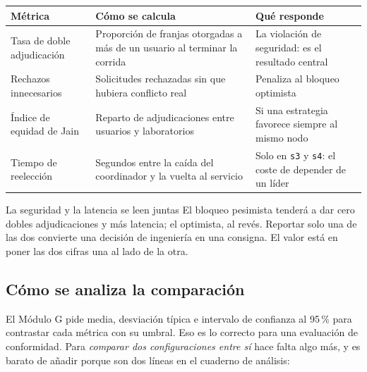 \documentclass[11pt,a4paper]{article}
\begin{document}
\begin{center}
	\small
	\begin{tabular}{@{}p{4.2cm}p{6.2cm}p{4.6cm}@{}}
		\toprule
		\textbf{Métrica} & \textbf{Cómo se calcula} & \textbf{Qué responde} \\
		\midrule
		Tasa de doble adjudicación & Proporción de franjas otorgadas a más de un usuario al terminar la corrida & La violación de seguridad: es el resultado central \\
		\addlinespace
		Rechazos innecesarios & Solicitudes rechazadas sin que hubiera conflicto real & Penaliza al bloqueo optimista \\
		\addlinespace
		Índice de equidad de Jain & Reparto de adjudicaciones entre usuarios y laboratorios & Si una estrategia favorece siempre al mismo nodo \\
		\addlinespace
		Tiempo de reelección & Segundos entre la caída del coordinador y la vuelta al servicio & Solo en \texttt{s3} y \texttt{s4}: el coste de depender de un líder \\
		\bottomrule
	\end{tabular}
\end{center}

\begin{avisoBox}{La seguridad y la latencia se leen juntas}
	El bloqueo pesimista tenderá a dar cero dobles adjudicaciones y más latencia; el optimista, al revés. Reportar solo una de las dos convierte una decisión de ingeniería en una consigna. El valor está en poner las dos cifras una al lado de la otra.
\end{avisoBox}

\subsection{Cómo se analiza la comparación}

El Módulo G pide media, desviación típica e intervalo de confianza al 95\,\% para contrastar cada métrica con su umbral. Eso es lo correcto para una evaluación de conformidad. Para \emph{comparar dos configuraciones entre sí} hace falta algo más, y es barato de añadir porque son dos líneas en el cuaderno de análisis:
\end{document}
